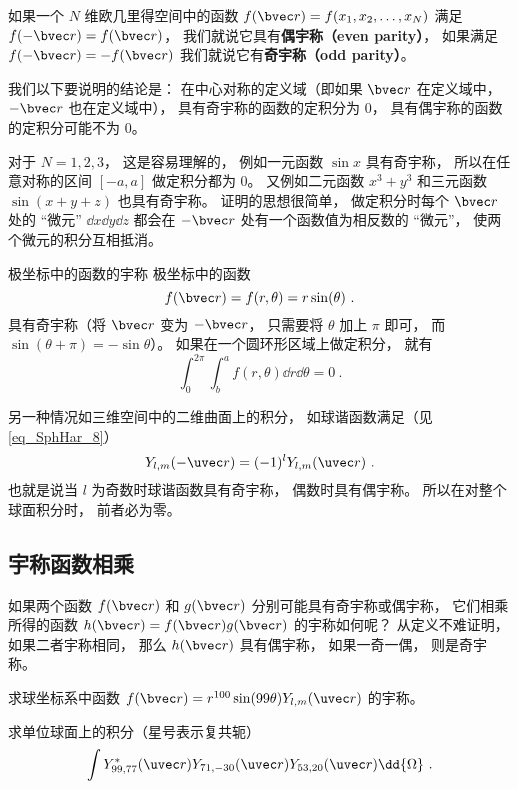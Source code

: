 

如果一个 $N$ 维欧几里得空间中的函数 $f(\bvec r) = f(x_1, x_2, \dots, x_N)$ 满足  $f(-\bvec r) = f(\bvec r)$， 我们就说它具有\textbf{偶宇称（even parity）}， 如果满足  $f(-\bvec r) = -f(\bvec r)$ 我们就说它有\textbf{奇宇称（odd parity）}。

我们以下要说明的结论是： 在中心对称的定义域（即如果 $\bvec r$ 在定义域中， $-\bvec r$ 也在定义域中）， 具有奇宇称的函数的定积分为 0， 具有偶宇称的函数的定积分可能不为 0。

对于 $N = 1, 2, 3$， 这是容易理解的， 例如一元函数 $\sin x$ 具有奇宇称， 所以在任意对称的区间 $[-a, a]$ 做定积分都为 0。 又例如二元函数 $x^3 + y^3$ 和三元函数 $\sin(x + y + z)$ 也具有奇宇称。 证明的思想很简单， 做定积分时每个 $\bvec r$ 处的 “微元” $\dd{x}\dd{y}\dd{z}$ 都会在 $-\bvec r$ 处有一个函数值为相反数的 “微元”， 使两个微元的积分互相抵消。

\begin{example}{极坐标中的函数的宇称}
极坐标中的函数
\begin{equation}\label{eq_IntPry_1}
f(\bvec r) = f(r, \theta) = r\sin(\theta)~.
\end{equation}
具有奇宇称（将 $\bvec r$ 变为 $-\bvec r$， 只需要将 $\theta$ 加上 $\pi$ 即可， 而 $\sin(\theta + \pi) = -\sin\theta$）。 如果在一个圆环形区域上做定积分， 就有
\begin{equation}
\int_0^{2\pi} \int_b^a f(r, \theta) \dd{r} \dd{\theta} = 0~.
\end{equation}
\end{example}

另一种情况如三维空间中的二维曲面上的积分， 如球谐函数满足（见\autoref{eq_SphHar_8}）
\begin{equation}\label{eq_IntPry_3}
Y_{l,m}(-\uvec r) = (-1)^l Y_{l,m}(\uvec r)~.
\end{equation}
也就是说当 $l$ 为奇数时球谐函数具有奇宇称， 偶数时具有偶宇称。 所以在对整个球面积分时， 前者必为零。

\subsection{宇称函数相乘}
如果两个函数 $f(\bvec r)$ 和 $g(\bvec r)$ 分别可能具有奇宇称或偶宇称， 它们相乘所得的函数 $h(\bvec r) = f(\bvec r) g(\bvec r)$ 的宇称如何呢？ 从定义不难证明， 如果二者宇称相同， 那么 $h(\bvec r)$ 具有偶宇称， 如果一奇一偶， 则是奇宇称。

\begin{exercise}{}
求球坐标系中函数 $f(\bvec r) = r^{100}\sin(99\theta) Y_{l, m}(\uvec r)$ 的宇称。
\end{exercise}

\begin{exercise}{}
求单位球面上的积分（星号表示复共轭）
\begin{equation}
\int Y_{99, 77}^*(\uvec r) Y_{71, -30}(\uvec r) Y_{53, 20}(\uvec r) \dd{\Omega}~.
\end{equation}
\end{exercise}
